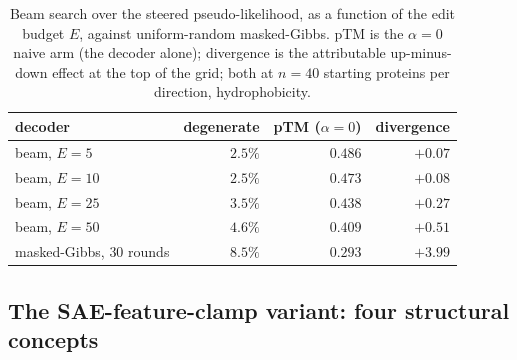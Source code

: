 \documentclass{article}
\begin{document}
\begin{table}[htbp]
\centering
\caption{Beam search over the steered pseudo-likelihood, as a function of the edit budget
$E$, against uniform-random masked-Gibbs. pTM is the $\alpha{=}0$ naive arm (the decoder
alone); divergence is the attributable up-minus-down effect at the top of the grid; both at
$n{=}40$ starting proteins per direction, hydrophobicity.}
\label{tab:steer-frontier}
\begin{tabular}{lrrr}
\toprule
decoder & degenerate & pTM ($\alpha{=}0$) & divergence \\
\midrule
beam, $E{=}5$   & $2.5\%$ & $0.486$ & $+0.07$ \\
beam, $E{=}10$  & $2.5\%$ & $0.473$ & $+0.08$ \\
beam, $E{=}25$  & $3.5\%$ & $0.438$ & $+0.27$ \\
beam, $E{=}50$  & $4.6\%$ & $0.409$ & $+0.51$ \\
masked-Gibbs, $30$ rounds & $8.5\%$ & $0.293$ & $+3.99$ \\
\bottomrule
\end{tabular}
\end{table}

\subsection{The SAE-feature-clamp variant: four structural concepts}
\label{app:steer-sae-clamp}
\end{document}
